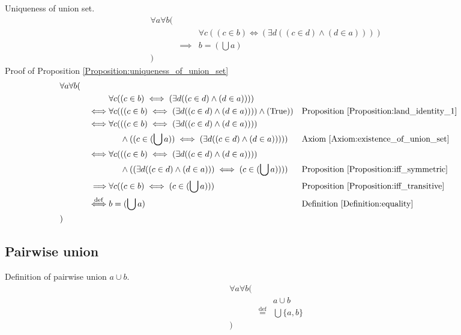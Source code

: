 \begin{prop}
\label{Proposition:uniqueness_of_union_set}
Uniqueness of union set.
\begin{align*}
& \forall a \forall b ( \\
& & & \forall c ((c \in b) \iff (\exists d ((c \in d) \land (d \in a)))) \\
& & \implies & b = (\bigcup a) \\
& )
\end{align*}
Proof of Proposition \ref{Proposition:uniqueness_of_union_set}
\begin{align*}
& \forall a \forall b ( \\
& & & \forall c ((c \in b) \iff (\exists d ((c \in d) \land (d \in a)))) \\
& & \iff & \forall c (((c \in b) \iff (\exists d ((c \in d) \land (d \in a)))) \land (\text{True}))
& & \text{Proposition \ref{Proposition:land_identity_1}} \\
& & \iff & \forall c (((c \in b) \iff (\exists d ((c \in d) \land (d \in a)))) \\
& & & \phantom{\forall c (} \land ((c \in (\bigcup a)) \iff (\exists d ((c \in d) \land (d \in a)))))
& & \text{Axiom \ref{Axiom:existence_of_union_set}} \\
& & \iff & \forall c (((c \in b) \iff (\exists d ((c \in d) \land (d \in a)))) \\
& & & \phantom{\forall c (} \land ((\exists d ((c \in d) \land (d \in a))) \iff (c \in (\bigcup a))))
& & \text{Proposition \ref{Proposition:iff_symmetric}} \\
& & \implies & \forall c ((c \in b) \iff (c \in (\bigcup a)))
& & \text{Proposition \ref{Proposition:iff_transitive}} \\
& & \overset{\operatorname{def}}{\iff} & b = (\bigcup a)
& & \text{Definition \ref{Definition:equality}} \\
& )
\end{align*}
\end{prop}

\subsection{Pairwise union}
\begin{defn}
\label{Definition:pairwise_union}
Definition of pairwise union $a \cup b$.
\begin{align*}
& \forall a \forall b ( \\
& & & a \cup b \\
& & \overset{\operatorname{def}}{=} & \bigcup \{ a , b \} \\
& )
\end{align*}
\end{defn}

